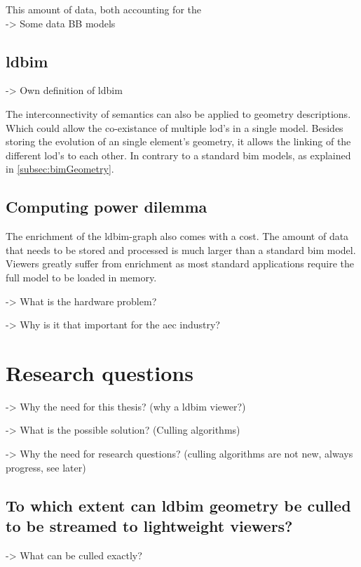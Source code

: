 This amount of data, both accounting for the \\
-> Some data BB models

\subsection{\acs{ldbim}}




-> Own definition of \ac{ldbim}

The interconnectivity of semantics can also be applied to geometry descriptions. Which could allow the co-existance of multiple \ac{lod}'s in a single model. Besides storing the evolution of an single element's geometry, it allows the linking of the different \ac{lod}'s to each other. In contrary to a standard \ac{bim} models, as explained in \ref{subsec:bimGeometry}.

\subsection{Computing power dilemma}
The enrichment of the \ac{ldbim}-graph also comes with a cost. The amount of data that needs to be stored and processed is much larger than a standard \ac{bim} model. Viewers greatly suffer from enrichment as most standard applications require the full model to be loaded in memory.

-> What is the hardware problem?

-> Why is it that important for the \ac{aec} industry?

\section{Research questions}

-> Why the need for this thesis? (why a \ac{ldbim} viewer?)

-> What is the possible solution? (Culling algorithms)

-> Why the need for research questions?
(culling algorithms are not new, always progress, see later)

\subsection[Can \acs{ldbim} be culled?]{To which extent can \acs{ldbim} geometry be culled\\
    to be streamed to lightweight viewers?}
-> What can be culled exactly?

